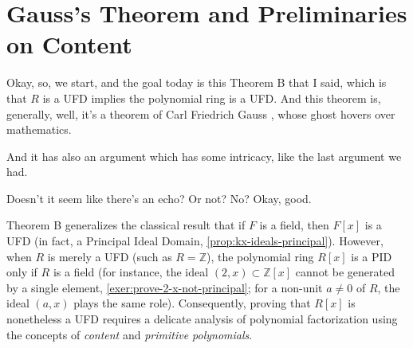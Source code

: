 \section{Gauss's Theorem and Preliminaries on Content}

\begin{speech}[00:00:00 - 00:00:41]
Okay, so, we start, and the goal today is this Theorem B that I said, which is that $R$ is a UFD implies the polynomial ring is a UFD.  And this theorem is, generally, well, it's a theorem of Carl Friedrich Gauss , whose ghost hovers over mathematics.

And it has also an argument which has some intricacy, like the last argument we had.

Doesn't it seem like there's an echo? Or not? No? Okay, good.
\end{speech}


\begin{content}

\begin{steps}
Theorem B generalizes the classical result that if $F$ is a field, then $F[x]$ is a UFD (in fact, a Principal Ideal Domain, \cref{prop:kx-ideals-principal}). However, when $R$ is merely a UFD (such as $R = \mathbb{Z}$), the polynomial ring $R[x]$ is a PID only if $R$ is a field (for instance, the ideal $(2, x) \subset \mathbb{Z}[x]$ cannot be generated by a single element, \cref{exer:prove-2-x-not-principal}; for a non-unit $a \neq 0$ of $R$, the ideal $(a, x)$ plays the same role). Consequently, proving that $R[x]$ is nonetheless a UFD requires a delicate analysis of polynomial factorization using the concepts of \emph{content} and \emph{primitive polynomials}.
\end{steps}
\end{content}

